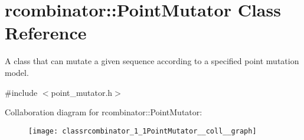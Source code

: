 \hypertarget{classrcombinator_1_1PointMutator}{}\section{rcombinator\+:\+:Point\+Mutator Class Reference}
\label{classrcombinator_1_1PointMutator}


A class that can mutate a given sequence according to a specified point mutation model.  




{\ttfamily \#include $<$point\+\_\+mutator.\+h$>$}



Collaboration diagram for rcombinator\+:\+:Point\+Mutator\+:\nopagebreak
\begin{figure}[H]
\begin{center}
\leavevmode
\texttt{[image: classrcombinator\_1\_1PointMutator\_\_coll\_\_graph]}
\end{center}
\end{figure}
